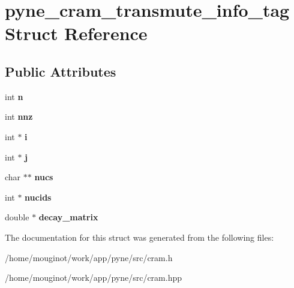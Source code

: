 \hypertarget{structpyne__cram__transmute__info__tag}{}\section{pyne\+\_\+cram\+\_\+transmute\+\_\+info\+\_\+tag Struct Reference}
\label{structpyne__cram__transmute__info__tag}
\subsection*{Public Attributes}
\begin{DoxyCompactItemize}
\item 
\mbox{\label{structpyne__cram__transmute__info__tag_ac288cdd5bdcf7a42524f107f314817bb}} 
int {\bfseries n}
\item 
\mbox{\label{structpyne__cram__transmute__info__tag_a6eb48aee2e991162735b683fa518b8c4}} 
int {\bfseries nnz}
\item 
\mbox{\label{structpyne__cram__transmute__info__tag_a0f2aaa764526bb30e8f4867776ced547}} 
int $\ast$ {\bfseries i}
\item 
\mbox{\label{structpyne__cram__transmute__info__tag_a42e7a923741efea92e3650fe515bed7d}} 
int $\ast$ {\bfseries j}
\item 
\mbox{\label{structpyne__cram__transmute__info__tag_a488f43cedb86c85781e662461a99fa6f}} 
char $\ast$$\ast$ {\bfseries nucs}
\item 
\mbox{\label{structpyne__cram__transmute__info__tag_a100a4bd9e087c3d68596e38ee01ca810}} 
int $\ast$ {\bfseries nucids}
\item 
\mbox{\label{structpyne__cram__transmute__info__tag_a0e8c1bf463754a76fc00d44a663a8fc4}} 
double $\ast$ {\bfseries decay\+\_\+matrix}
\end{DoxyCompactItemize}


The documentation for this struct was generated from the following files\+:\begin{DoxyCompactItemize}
\item 
/home/mouginot/work/app/pyne/src/cram.\+h\item 
/home/mouginot/work/app/pyne/src/cram.\+hpp\end{DoxyCompactItemize}
